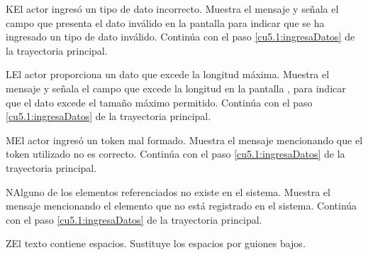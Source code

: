  \begin{UCtrayectoriaA}{K}{El actor ingresó un tipo de dato incorrecto.}
    \UCpaso[\UCsist] Muestra el mensaje  y señala el campo que presenta el dato inválido en la 
    pantalla  para indicar que se ha ingresado un tipo de dato inválido.
    \UCpaso[] Continúa con el paso \ref{cu5.1:ingresaDatos} de la trayectoria principal.
 \end{UCtrayectoriaA}
 \begin{UCtrayectoriaA}{L}{El actor proporciona un dato que excede la longitud máxima.}
    \UCpaso[\UCsist] Muestra el mensaje  y señala el campo que excede la 
    longitud en la pantalla , para indicar que el dato excede el tamaño máximo permitido.
    \UCpaso[] Continúa con el paso \ref{cu5.1:ingresaDatos} de la trayectoria principal.
 \end{UCtrayectoriaA}
 \begin{UCtrayectoriaA}{M}{El actor ingresó un token mal formado.}
    \UCpaso[\UCsist] Muestra el mensaje  mencionando que el token utilizado no es correcto.
    \UCpaso[] Continúa con el paso \ref{cu5.1:ingresaDatos} de la trayectoria principal.
 \end{UCtrayectoriaA}
 \begin{UCtrayectoriaA}{N}{Alguno de los elementos referenciados no existe en el sistema.}
    \UCpaso[\UCsist] Muestra el mensaje  mencionando el elemento que no está registrado en el sistema.
    \UCpaso[] Continúa con el paso \ref{cu5.1:ingresaDatos} de la trayectoria principal.
 \end{UCtrayectoriaA}
 
 \begin{UCtrayectoriaA}{Z}{El texto contiene espacios.}
    \UCpaso[\UCsist] Sustituye los espacios por guiones bajos.
 \end{UCtrayectoriaA}
 

